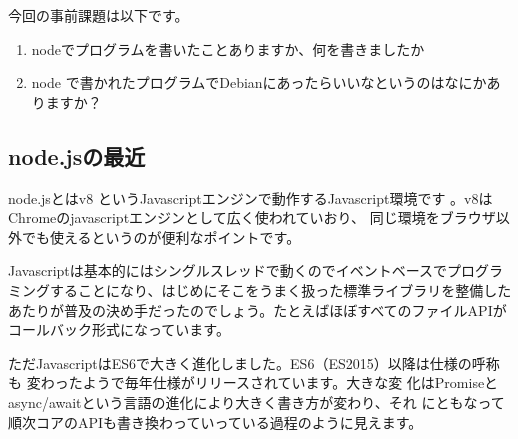 \documentclass[mingoth,a4paper]{jsarticle}
\begin{document}

今回の事前課題は以下です。

\begin{enumerate}
 \item nodeでプログラムを書いたことありますか、何を書きましたか
 \item node で書かれたプログラムでDebianにあったらいいなというのはなにかありますか？
\end{enumerate}


\begin{multicols}{2}
{\small
% 
}
\end{multicols}

%
%
%
%




\subsection{node.jsの最近}

node.jsとはv8 というJavascriptエンジンで動作するJavascript環境です
\cite{nodejsorg}。v8はChromeのjavascriptエンジンとして広く使われていおり、
同じ環境をブラウザ以外でも使えるというのが便利なポイントです。

Javascriptは基本的にはシングルスレッドで動くのでイベントベースでプログラ
ミングすることになり、はじめにそこをうまく扱った標準ライブラリを整備した
あたりが普及の決め手だったのでしょう。たとえばほぼすべてのファイルAPIが
コールバック形式になっています。

ただJavascriptはES6で大きく進化しました。ES6（ES2015）以降は仕様の呼称も
変わったようで毎年仕様がリリースされています\cite{nodejs-es6}。大きな変
化はPromiseとasync/awaitという言語の進化により大きく書き方が変わり、それ
にともなって順次コアのAPIも書き換わっていっている過程のように見えます。
\end{document}
